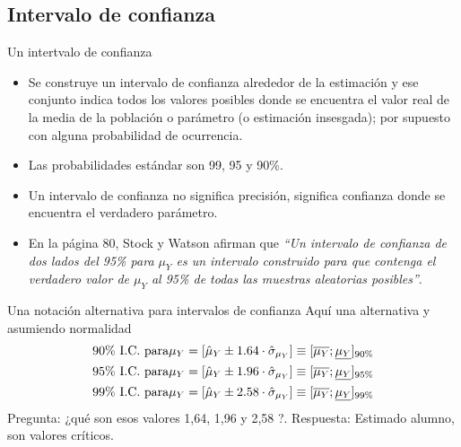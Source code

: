 \subsection{Intervalo de confianza}
\begin{frame}{Un intertvalo de confianza}
	\begin{itemize}
		\item Se construye un intervalo de confianza alrededor de la estimación y ese conjunto indica todos los valores posibles donde se encuentra el valor real de la media de la población o parámetro (o estimación insesgada); por supuesto con alguna probabilidad de ocurrencia.
		\item Las probabilidades estándar son 99, 95 y 90\%.
		\item Un intervalo de confianza no significa precisión, significa confianza donde se encuentra el verdadero parámetro.
		\item En la página 80, Stock y Watson afirman que \textit{``Un intervalo de confianza de dos lados del 95\% para $\mu_{Y}$ es un intervalo construido para que contenga el verdadero valor de $\mu_{Y}$ al 95\% de todas las muestras aleatorias posibles''}.
	\end{itemize}
\end{frame}
\begin{frame}{Una notación alternativa para intervalos de confianza}
	Aquí una alternativa y asumiendo normalidad
		\begin{align*}
			& 90\% \textup{ I.C. para} \mu_{Y} =[\hat{\mu}_{Y} \pm 1.64 \cdot \hat{\sigma}_{\mu_{Y}}] \equiv [\overline{\mu_{Y}}; \underline{\mu_{Y}}]_{90\%}\\
			& 95\% \textup{ I.C. para} \mu_{Y} =[\hat{\mu}_{Y} \pm 1.96 \cdot \hat{\sigma}_{\mu_{Y}}] \equiv [\overline{\mu_{Y}}; \underline{\mu_{Y}}]_{95\%}\\
			& 99\% \textup{ I.C. para} \mu_{Y} =[\hat{\mu}_{Y} \pm 2.58 \cdot \hat{\sigma}_{\mu_{Y}}] \equiv [\overline{\mu_{Y}}; \underline{\mu_{Y}}]_{99\%}
		\end{align*}
	Pregunta: ¿qué son esos valores 1,64, 1,96 y 2,58 ?. Respuesta: Estimado alumno, son valores críticos.
\end{frame}

